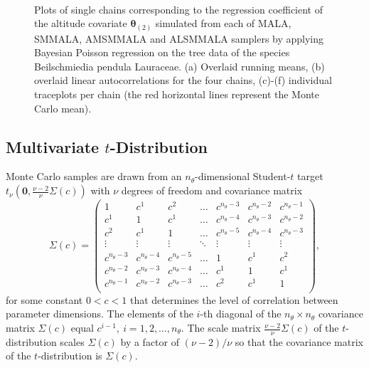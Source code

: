 \documentclass[twoside,11pt]{article}
\begin{document}
\begin{figure}
{	}
	 \\ 
	\caption{Plots of single chains corresponding to the regression coefficient of the altitude covariate
		$\boldsymbol{\theta}_{(2)}$ simulated from each of MALA, SMMALA, AMSMMALA and ALSMMALA samplers by applying Bayesian 
		Poisson regression on the tree data of the species Beilschmiedia pendula Lauraceae. (a) Overlaid running means, (b) 
		overlaid linear autocorrelations for the four chains, (c)-(f) individual traceplots per chain (the red horizontal lines 
		represent the Monte Carlo mean).}
	\label{fig:poisson}
\end{figure}

\subsection{Multivariate $t$-Distribution}

Monte Carlo samples are drawn from an $n_{\theta}$-dimensional Student-$t$ target
$t_{\nu}(\mathbf{0},\frac{\nu-2}{\nu}\Sigma(c))$ with $\nu$ degrees of freedom and covariance matrix
\begin{equation}
\label{tp:eq:normal:sigma}
\Sigma(c)=\left(\begin{array}{ccccccc}
1 & c^1 & c^2 & \dots & c^{n_{\theta}-3} & c^{n_{\theta}-2} & c^{n_{\theta}-1} \\
c^1 & 1 & c^1 & \dots & c^{n_{\theta}-4} & c^{n_{\theta}-3} & c^{n_{\theta}-2} \\
c^2 & c^1 & 1 & \dots & c^{n_{\theta}-5} & c^{n_{\theta}-4} & c^{n_{\theta}-3} \\
\vdots & \vdots & \vdots & \ddots & \vdots & \vdots & \vdots \\
c^{n_{\theta}-3} & c^{n_{\theta}-4} & c^{n_{\theta}-5} & \dots & 1 & c^{1} & c^{2} \\
c^{n_{\theta}-2} & c^{n_{\theta}-3} & c^{n_{\theta}-4} & \dots & c^{1} & 1 & c^{1} \\
c^{n_{\theta}-1} & c^{n_{\theta}-2} & c^{n_{\theta}-3} & \dots & c^{2} & c^1 & 1 \\
\end{array}\right),
\end{equation}
for some constant $0<c<1$ that determines the level of correlation between parameter dimensions. The elements of the 
$i$-th diagonal of the $n_{\theta}\times n_{\theta}$ covariance matrix $\Sigma(c)$ equal $c^{i-1},~i=1,2,\dots,n_{\theta}$.
The scale matrix $\frac{\nu-2}{\nu}\Sigma(c)$ of the $t$-distribution scales $\Sigma(c)$ by a factor of $(\nu-2)/\nu$ so that 
the covariance matrix of the $t$-distribution is $\Sigma(c)$.
\end{document}
